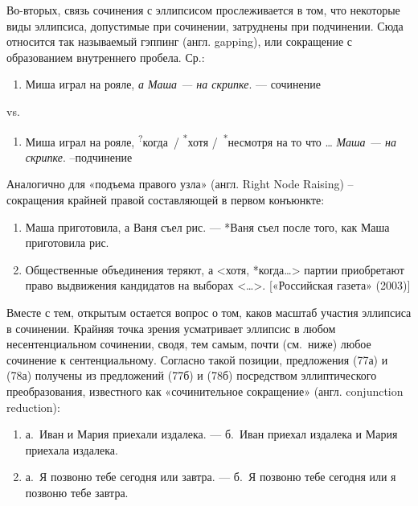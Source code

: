 Во-вторых, связь сочинения с эллипсисом прослеживается в том, что
некоторые виды эллипсиса, допустимые при сочинении, затруднены при
подчинении. Сюда относится так называемый гэппинг (англ. gapping), или
сокращение с образованием внутреннего пробела. Ср.:

\begin{enumerate}
  \def\labelenumi{(\arabic{enumi})}
  \setcounter{enumi}{72}
  \item
        Миша играл на рояле, \textit{а Маша --- на скрипке}. --- сочинение
\end{enumerate}

vs.

\begin{enumerate}
  \def\labelenumi{(\arabic{enumi})}
  \setcounter{enumi}{73}
  \item
        Миша играл на рояле, \textsuperscript{?}когда~/
        \textsuperscript{*}хотя /~\textsuperscript{*}несмотря на то что
        \ldots{} \textit{Маша --- на скрипке}. --подчинение
\end{enumerate}

Аналогично для «подъема правого узла» (англ. Right Node Raising) --
сокращения крайней правой составляющей в первом конъюнкте:

\begin{enumerate}
  \def\labelenumi{(\arabic{enumi})}
  \setcounter{enumi}{74}
  \item
        Маша приготовила, а Ваня съел рис. --- *Ваня съел после того, как Маша
        приготовила рис.
  \item
        Общественные объединения теряют, а \textless*хотя,
        *когда\ldots\textgreater{} партии приобретают право выдвижения
        кандидатов на выборах \textless\ldots\textgreater. {[}«Российская
        газета» (2003){]}
\end{enumerate}

Вместе с тем, открытым остается вопрос о том, каков масштаб участия
эллипсиса в сочинении. Крайняя точка зрения усматривает эллипсис в любом
несентенциальном сочинении, сводя, тем самым, почти (см.~ниже) любое
сочинение к сентенциальному. Согласно такой позиции, предложения (77а) и
(78а) получены из предложений (77б) и (78б) посредством эллиптического
преобразования, известного как «сочинительное сокращение» (англ.
conjunction reduction):

\begin{enumerate}
  \def\labelenumi{(\arabic{enumi})}
  \setcounter{enumi}{76}
  \item
        а.~Иван и Мария приехали издалека. --- б.~Иван приехал издалека и Мария
        приехала издалека.
  \item
        а.~Я позвоню тебе сегодня или завтра. --- б.~Я позвоню тебе сегодня или
        я позвоню тебе завтра.
\end{enumerate}


